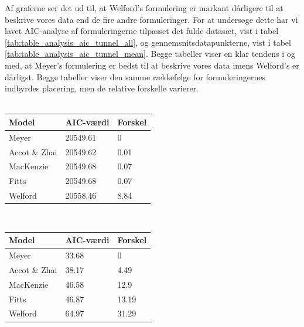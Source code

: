 Af graferne ser det ud til, at Welford's formulering er markant dårligere til at beskrive vores data end de fire andre formuleringer. For at undersøge dette har vi lavet AIC-analyse af formuleringerne tilpasset det fulde datasæt, vist i tabel \ref{tab:table_analysis_aic_tunnel_all}, og gennemsnitsdatapunkterne, vist i tabel \ref{tab:table_analysis_aic_tunnel_mean}. Begge tabeller viser en klar tendens i og med, at Meyer's formulering er bedst til at beskrive vores data imens Welford's er dårligst. Begge tabeller viser den samme rækkefølge for formuleringernes indbyrdes placering, men de relative forskelle varierer.\\\\
\begin{minipage}[t]{\linewidth} 
	\begin{minipage}[t]{0.45\linewidth}
			\begin{tabular}{lll}
				Model & AIC-værdi & Forskel\\\hline
				Meyer & 20549.61 & 0 \\
				Accot \& Zhai & 20549.62 & 0.01\\
				MacKenzie & 20549.68 & 0.07 \\
				Fitts & 20549.68 & 0.07\\
				Welford & 20558.46 & 8.84
			\end{tabular}
			\label{tab:table_analysis_aic_tunnel_all}
	\end{minipage}
	\begin{minipage}[t]{0.1\linewidth}
	~
	\end{minipage}
	\begin{minipage}[t]{0.45\linewidth}
			\begin{tabular}{lll}
				Model & AIC-værdi & Forskel\\\hline
				Meyer & 33.68 & 0 \\
				Accot \& Zhai & 38.17 & 4.49\\
				MacKenzie & 46.58 & 12.9 \\
				Fitts & 46.87 & 13.19\\
				Welford & 64.97 & 31.29
			\end{tabular}
			\label{tab:table_analysis_aic_tunnel_mean}
	\end{minipage}
\end{minipage}\\\\
